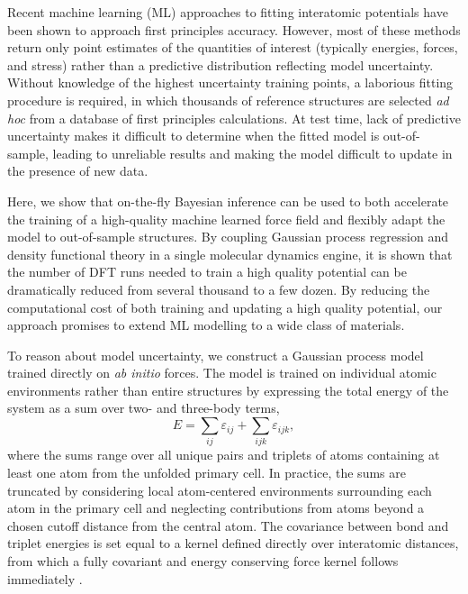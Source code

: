 \documentclass[%
reprint,
superscriptaddress,
amsmath,amssymb,
aps,
prl,
]{revtex4-1}
\begin{document}
Recent machine learning (ML) approaches to fitting interatomic potentials have been shown to approach first principles accuracy. However, most of these methods return only point estimates of the quantities of interest (typically energies, forces, and stress) rather than a predictive distribution reflecting model uncertainty. Without knowledge of the highest uncertainty training points, a laborious fitting procedure is required, in which thousands of reference structures are selected \textit{ad hoc} from a database of first principles calculations. At test time, lack of predictive uncertainty makes it difficult to determine when the fitted model is out-of-sample, leading to unreliable results and making the model difficult to update in the presence of new data.

Here, we show that on-the-fly Bayesian inference can be used to both accelerate the training of a high-quality machine learned force field and flexibly adapt the model to out-of-sample structures. By coupling Gaussian process regression and density functional theory in a single molecular dynamics engine, it is shown that the number of DFT runs needed to train a high quality potential can be dramatically reduced from several thousand to a few dozen. By reducing the computational cost of both training and updating a high quality potential, our approach promises to extend ML modelling to a wide class of materials.

To reason about model uncertainty, we construct a Gaussian process model trained directly on \textit{ab initio} forces. The model is trained on individual atomic environments rather than entire structures by expressing the total energy of the system as a sum over two- and three-body terms,
\begin{equation}
E = \sum_{ij} \varepsilon_{ij} + \sum_{ijk} \varepsilon_{ijk},
\end{equation}
where the sums range over all unique pairs and triplets of atoms containing at least one atom from the unfolded primary cell. In practice, the sums are truncated by considering local atom-centered environments surrounding each atom in the primary cell and neglecting contributions from atoms beyond a chosen cutoff distance from the central atom. The covariance between bond and triplet energies is set equal to a kernel defined directly over interatomic distances, from which a fully covariant and energy conserving force kernel follows immediately \cite{glielmo2017accurate, glielmo2018efficient}. 


\end{document}

